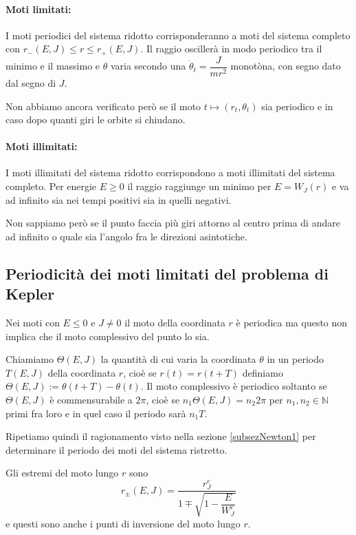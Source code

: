 \documentclass[11pt,a4paper,twoside]{book}
\theoremstyle{esss}
\theoremstyle{dotless}
\numberwithin{equation}{section} %
\begin{document}
\paragraph{Moti limitati:} I moti periodici del sistema ridotto corrisponderanno a moti del sistema completo con $r_-(E,J) \leq r \leq r_+(E,J)$. Il raggio oscillerà in modo periodico tra il minimo e il massimo e $\theta$ varia secondo una $\dot{\theta}_t=\dfrac{J}{mr^2}$ monotòna, con segno dato dal segno di $J$.

Non abbiamo ancora verificato però se il moto $t\mapsto(r_t,\theta_t)$ sia periodico e in caso dopo quanti giri le orbite si chiudano.

\paragraph{Moti illimitati:}I moti illimitati del sistema ridotto corrispondono a moti illimitati del sistema completo. Per energie $E\geq0$ il raggio raggiunge un minimo per $E=W_J(r)$ e va ad infinito sia nei tempi positivi sia in quelli negativi.

Non sappiamo però se il punto faccia più giri attorno al centro prima di andare ad infinito o quale sia l'angolo fra le direzioni asintotiche.

\subsection{Periodicità dei moti limitati del problema di Kepler}

Nei moti con $E\leq0$ e $J\neq0$ il moto della coordinata $r$ è periodica ma questo non implica che il moto complessivo del punto lo sia.

Chiamiamo $\Theta(E,J)$ la quantità di cui varia la coordinata $\theta$ in un periodo $T(E,J)$ della coordinata $r$, cioè se $r(t)=r(t+T)$ definiamo $\Theta(E,J):=\theta(t+T)-\theta(t)$.
Il moto complessivo è periodico soltanto se $\Theta(E,J)$ è commensurabile a $2\pi$, cioè se $n_1\Theta(E,J)=n_2 2\pi$ per $n_1,n_2\in\mathbb{N}$ primi fra loro e in quel caso il periodo sarà $n_1T$.

Ripetiamo quindi il ragionamento visto nella sezione \ref{subsezNewton1} per determinare il periodo dei moti del sistema ristretto.

Gli estremi del moto lungo $r$ sono
\[
r_{\pm}(E,J)=\dfrac{r_J^c}{1\mp\sqrt{1-\dfrac{E}{W_J^c}} }
\]
e questi sono anche i punti di inversione del moto lungo $r$.
\end{document}
